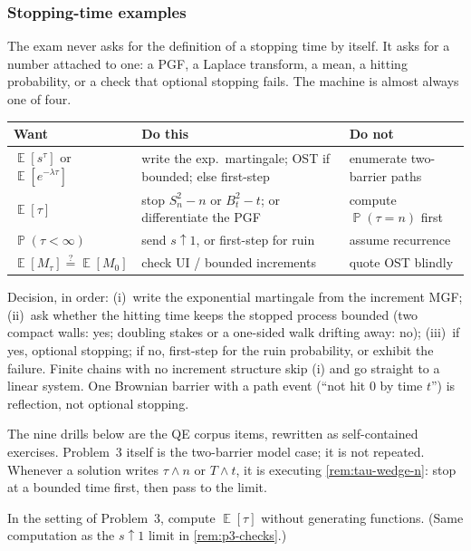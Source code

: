 \documentclass[11pt,a4paper]{article}
\DeclareMathOperator{\E}{\mathbb{E}}
\DeclareMathOperator{\Pbb}{\mathbb{P}}
\begin{document}
\subsubsection{Stopping-time examples}

The exam never asks for the definition of a stopping time by itself. It asks for a number attached to one: a PGF, a Laplace transform, a mean, a hitting probability, or a check that optional stopping fails. The machine is almost always one of four.

\begin{center}
\renewcommand{\arraystretch}{1.2}
\small
\begin{tabular}{@{}p{}p{}p{}@{}}
\toprule
Want & Do this & Do not \\
\midrule
\( \E[s^{\tau}] \) or \( \E[e^{-\lambda\tau}] \)
  & write the exp.\ martingale; OST if bounded; else first-step
  & enumerate two-barrier paths \\
\( \E[\tau] \)
  & stop \( S_n^{2}-n \) or \( B_t^{2}-t \); or differentiate the PGF
  & compute \( \Pbb(\tau=n) \) first \\
\( \Pbb(\tau<\infty) \)
  & send \( s\uparrow 1 \), or first-step for ruin
  & assume recurrence \\
\( \E[M_{\tau}]\stackrel{?}{=}\E[M_0] \)
  & check UI / bounded increments
  & quote OST blindly \\
\bottomrule
\end{tabular}
\end{center}

Decision, in order: (i)~write the exponential martingale from the increment MGF; (ii)~ask whether the hitting time keeps the stopped process bounded (two compact walls: yes; doubling stakes or a one-sided walk drifting away: no); (iii)~if yes, optional stopping; if no, first-step for the ruin probability, or exhibit the failure. Finite chains with no increment structure skip (i) and go straight to a linear system. One Brownian barrier with a path event (``not hit \( 0 \) by time \( t \)'') is reflection, not optional stopping.

The nine drills below are the QE corpus items, rewritten as self-contained exercises. Problem~3 itself is the two-barrier model case; it is not repeated. Whenever a solution writes \( \tau\wedge n \) or \( T\wedge t \), it is executing \cref{rem:tau-wedge-n}: stop at a bounded time first, then pass to the limit.

\begin{example}
\label{ex:stop-s2n}
In the setting of Problem~3, compute \( \E[\tau] \) without generating functions. (Same computation as the \( s\uparrow 1 \) limit in \cref{rem:p3-checks}.)
\end{example}
\end{document}
